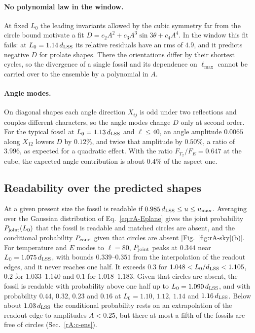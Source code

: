 \paragraph{No polynomial law in the window.}
At fixed $L_0$ the leading invariants allowed by the cubic symmetry far from the circle bound motivate a fit $D=c_2A^2+c_3A^3\sin3\theta+c_4A^4$.
In the window this fit fails: at $L_0=1.14\,d_{\mathrm{LSS}}$ its relative residuals have an rms of $4.9$, and it predicts negative $D$ for prolate shapes. %
There the orientations differ by their shortest cycles, so the divergence of a single fossil and its dependence on $\ell_{\max}$ cannot be carried over to the ensemble by a polynomial in $A$.

\paragraph{Angle modes.}
On diagonal shapes each angle direction $X_{ij}$ is odd under two reflections and couples different characters, so the angle modes change $D$ only at second order.
For the typical fossil at $L_0=1.13\,d_{\mathrm{LSS}}$ and $\ell\leq40$, an angle amplitude $0.0065$ along $X_{12}$ lowers $D$ by $0.12\%$, and twice that amplitude by $0.50\%$, a ratio of $3.996$, as expected for a quadratic effect. %
With the ratio $F_{T_2}/F_E=0.647$ at the cube, the expected angle contribution is about $0.4\%$ of the aspect one. %

\subsection{Readability over the predicted shapes}
\label{rA:c-ensemble}

At a given present size the fossil is readable if $0.985\,d_{\mathrm{LSS}}\leq u\leq u_{\max}$. %
Averaging over the Gaussian distribution of Eq.~\eqref{eq:rA-Eplane} gives the joint probability $P_{\rm joint}(L_0)$ that the fossil is readable and matched circles are absent, and the conditional probability $P_{\rm cond}$ given that circles are absent [Fig.~\ref{fig:rA-sky}(b)].
For temperature and $E$ modes to $\ell=80$, $P_{\rm joint}$ peaks at $0.344$ near $L_0=1.075\,d_{\mathrm{LSS}}$, with bounds $0.339$--$0.351$ from the interpolation of the readout edges, and it never reaches one half. %
It exceeds $0.3$ for $1.048<L_0/d_{\mathrm{LSS}}<1.105$, $0.2$ for $1.033$--$1.140$ and $0.1$ for $1.018$--$1.183$. %
Given that circles are absent, the fossil is readable with probability above one half up to $L_0=1.090\,d_{\mathrm{LSS}}$, and with probability $0.44$, $0.32$, $0.23$ and $0.16$ at $L_0=1.10$, $1.12$, $1.14$ and $1.16\,d_{\mathrm{LSS}}$. %
Below about $1.03\,d_{\mathrm{LSS}}$ the conditional probability rests on an extrapolation of the readout edge to amplitudes $A<0.25$, but there at most a fifth of the fossils are free of circles (Sec.~\ref{rA:c-ens}). %

